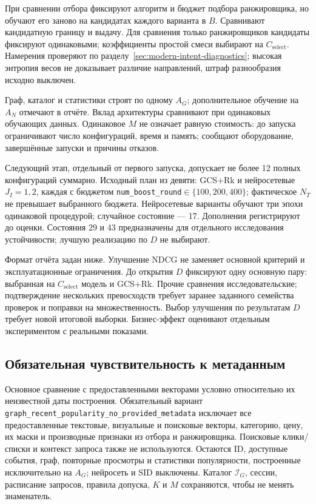\documentclass[12pt,a4paper]{article}
\newcommand{\code}[1]{{\ttfamily\small\nolinkurl{#1}}}
\theoremstyle{plainru}
\begin{document}
При сравнении отбора фиксируют алгоритм и бюджет подбора ранжировщика,
но обучают его заново на кандидатах каждого варианта в $B$.
Сравнивают кандидатную границу и выдачу.
Для сравнения только ранжировщиков кандидаты
фиксируют одинаковыми; коэффициенты простой смеси выбирают на $C_{\mathrm{select}}$.
Намерения проверяют по разделу~\ref{sec:modern-intent-diagnostics};
высокая энтропия весов не доказывает различие направлений,
штраф разнообразия исходно выключен.

Граф, каталог и статистики строят по одному $A_G$; дополнительное
обучение на $A_N$ отмечают в отчёте. Вклад архитектуры сравнивают
при одинаковых обучающих данных. Одинаковое $M$ не означает равную
стоимость: до запуска ограничивают число конфигураций, время и память;
сообщают оборудование, завершённые запуски и причины отказов.

Следующий этап, отдельный от первого запуска, допускает не более
12 полных конфигураций суммарно. Исходный план из девяти:
GCS+Rk и нейросетевые $J_I=1,2$, каждая с бюджетом
\code{num_boost_round}$\in\{100,200,400\}$; фактическое $N_T$
не превышает выбранного бюджета.
Нейросетевые варианты обучают три эпохи одинаковой процедурой;
случайное состояние --- 17. Дополнения регистрируют до оценки.
Состояния 29 и 43 предназначены для отдельного исследования
устойчивости; лучшую реализацию по $D$ не выбирают.

Формат отчёта задан ниже. Улучшение NDCG не заменяет основной критерий
и эксплуатационные ограничения. До открытия $D$ фиксируют одну
основную пару: выбранная на $C_{\mathrm{select}}$ модель и GCS+Rk. Прочие сравнения
исследовательские; подтверждение нескольких превосходств требует
заранее заданного семейства проверок и поправки на множественность.
Выбор улучшения по результатам $D$ требует новой итоговой выборки.
Бизнес-эффект оценивают отдельным экспериментом с реальными показами.

\subsection{Обязательная чувствительность к метаданным}
\label{sec:metadata-sensitivity}

Основное сравнение с предоставленными векторами условно относительно
их неизвестной даты построения. Обязательный вариант
\code{graph_recent_popularity_no_provided_metadata} исключает все
предоставленные текстовые, визуальные и поисковые векторы, категорию,
цену, их маски и производные признаки из отбора и ранжировщика.
Поисковые клики/списки и контекст запроса также не используются.
Остаются ID, доступные события, граф, повторные просмотры и статистики
популярности, построенные исключительно на $A_G$; нейросеть и SID
выключены. Каталог $\mathcal I_G$, сессии, расписание запросов,
правила допуска, $K$ и $M$ сохраняются, чтобы не менять знаменатель.
\end{document}
